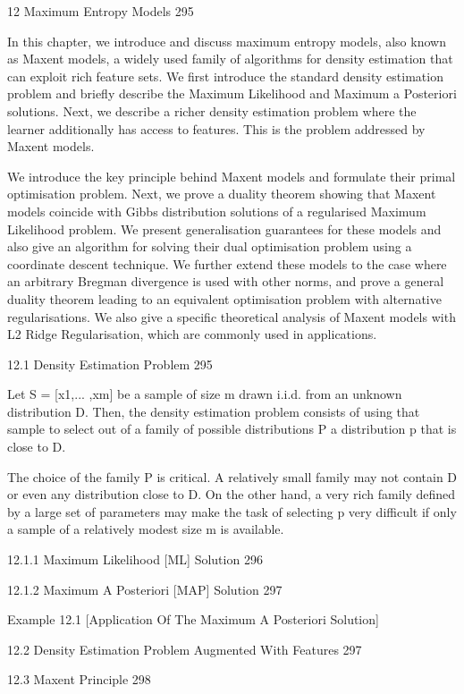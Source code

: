 12 Maximum Entropy Models 295

In this chapter, we introduce and discuss maximum entropy models, also known as Maxent models, a widely used family of algorithms for density estimation that can exploit rich feature sets. We first introduce the standard density estimation problem and briefly describe the Maximum Likelihood and Maximum a Posteriori solutions. Next, we describe a richer density estimation problem where the learner additionally has access to features. This is the problem addressed by Maxent models.

We introduce the key principle behind Maxent models and formulate their primal optimisation problem. Next, we prove a duality theorem showing that Maxent models coincide with Gibbs distribution solutions of a regularised Maximum Likelihood problem. We present generalisation guarantees for these models and also give an algorithm for solving their dual optimisation problem using a coordinate descent technique. We further extend these models to the case where an arbitrary Bregman divergence is used with other norms, and prove a general duality theorem leading to an equivalent optimisation problem with alternative regularisations. We also give a specific theoretical analysis of Maxent models with L2 Ridge Regularisation, which are commonly used in applications.

12.1 Density Estimation Problem 295

Let S = [x1,... ,xm] be a sample of size m drawn i.i.d. from an unknown distribution D. Then, the density estimation problem consists of using that sample to select out of a family of possible distributions P a distribution p that is close to D.

The choice of the family P is critical. A relatively small family may not contain D or even any distribution close to D. On the other hand, a very rich family defined by a large set of parameters may make the task of selecting p very difficult if only a sample of a relatively modest size m is available.

12.1.1 Maximum Likelihood [ML] Solution 296



12.1.2 Maximum A Posteriori [MAP] Solution 297

Example 12.1 [Application Of The Maximum A Posteriori Solution]

12.2 Density Estimation Problem Augmented With Features 297



12.3 Maxent Principle 298



